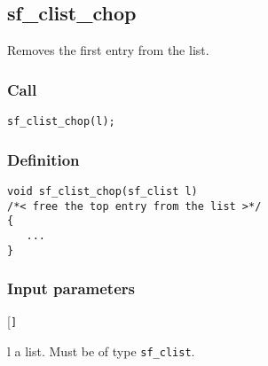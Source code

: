 \subsection{{sf\_clist\_chop}}
Removes the first entry from the list.

\subsubsection*{Call}
\begin{verbatim}sf_clist_chop(l);\end{verbatim}

\subsubsection*{Definition}
\begin{verbatim}
void sf_clist_chop(sf_clist l) 
/*< free the top entry from the list >*/
{
   ...
}
\end{verbatim}

\subsubsection*{Input parameters}
\begin{desclist}{\tt }{\quad}[\tt ]
   \setlength\itemsep{0pt}
   \item[l] a list. Must be of type \texttt{sf\_clist}.  
\end{desclist}



